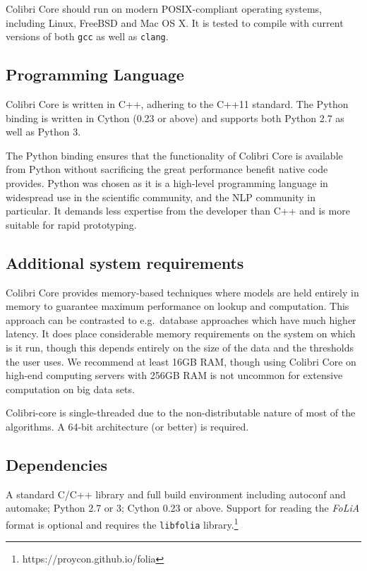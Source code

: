 \documentclass[a4paper,12pt]{article}
\begin{document}
Colibri Core should run on modern POSIX-compliant operating systems, including
Linux, FreeBSD and Mac OS X. It is tested to compile with current versions of
both \texttt{gcc} as well as \texttt{clang}.

\subsection{Programming Language}

Colibri Core is written in C++, adhering to the C++11 standard. The Python
binding is written in Cython (0.23 or above) and supports both Python 2.7 as
well as Python 3.

The Python binding ensures that the functionality of Colibri Core is available
from Python without sacrificing the great performance benefit native code
provides. Python was chosen as it is a high-level programming language in
widespread use in the scientific community, and the NLP community in
particular. It demands less expertise from the developer than C++ and is more
suitable for rapid prototyping.

\subsection{Additional system requirements}

Colibri Core provides memory-based techniques where models are held entirely in
memory to guarantee maximum performance on lookup and computation.  This
approach can be contrasted to e.g.\ database approaches which have much higher
latency.  It does place considerable memory requirements on the system on which
is it run, though this depends entirely on the size of the data and the
thresholds the user uses.  We recommend at least 16GB RAM, though using Colibri
Core on high-end computing servers with 256GB RAM is not uncommon for extensive
computation on big data sets.

Colibri-core is single-threaded due to the non-distributable nature of most of the
algorithms. A 64-bit architecture (or better) is required.

\subsection{Dependencies}

A standard C/C++ library and full build environment including autoconf and
automake; Python 2.7 or 3; Cython 0.23 or above. Support for reading the
\emph{FoLiA} format is optional and requires the \texttt{libfolia}
library.\footnote{https://proycon.github.io/folia}
\end{document}
